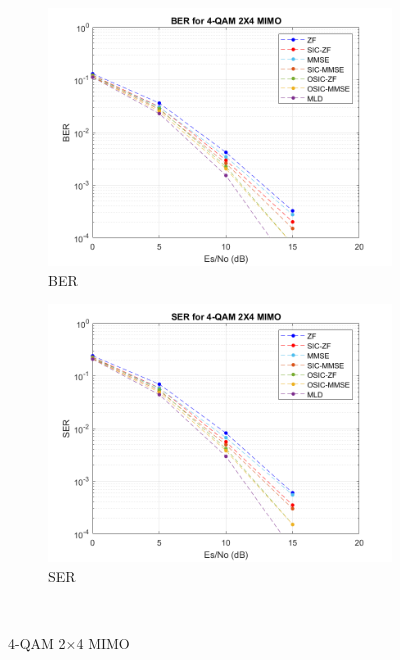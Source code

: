 \documentclass{article}
\begin{document}
\begin{figure}[H]
	\centering
	\begin{subfigure}{0.5\textwidth}
		\centerline{\includegraphics[width=1\textwidth]{BER_2x4_4qam.png}}
		\caption{BER}
	\end{subfigure}%
	\begin{subfigure}{0.5\textwidth}
		\centerline{\includegraphics[width=1\textwidth]{SER_2x4_4qam.png}}
		\caption{SER}
	\end{subfigure}\\%
	\caption{4-QAM 2$\times$4 MIMO}
\end{figure}
\end{document}
